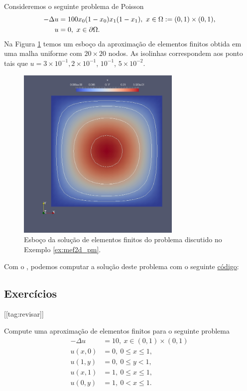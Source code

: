 \begin{ex}\label{ex:mef2d_pm}
  Consideremos o seguinte problema de Poisson
  \begin{align}
    -\Delta u &= 100x_0(1-x_0)x_1(1-x_1),~x\in\Omega:=(0, 1)\times (0, 1),\\
    u &= 0,~x\in\partial\Omega.
  \end{align}
  Na Figura \ref{fig:mef2d_pm} temos um esboço da aproximação de elementos finitos obtida em uma malha uniforme com $20\times 20$ nodos. As isolinhas correspondem aos ponto tais que $u=3\times 10^{-1}, 2\times 10^{-1}$, $10^{-1}$, $5\times 10^{-2}$.

  \begin{figure}[h!]
    \centering
    \includegraphics[width=0.7\textwidth]{./cap_mef2d/dados/ex_mef2d_pm/fig_mef2d_pm}
    \caption{Esboço da solução de elementos finitos do problema discutido no Exemplo \ref{ex:mef2d_pm}.}
    \label{fig:mef2d_pm}
  \end{figure}

\ifispython
Com o \fenics, podemos computar a solução deste problema com o seguinte \href{https://github.com/phkonzen/notas/blob/master/src/MetodoElementosFinitos/cap_mef2d/dados/ex_mef2d_pm/ex_mef2d_pm.py}{código}:

\fi
\end{ex}

\subsection{Exercícios}
[[tag:revisar]]


\begin{exer}
  Compute uma aproximação de elementos finitos para o seguinte problema
\begin{align}
  -\Delta u &= 10,~x\in (0, 1)\times (0, 1)\\
  u(x,0) &= 0,~0\leq x \leq 1,\\
  u(1,y) &= 0,~0\leq y < 1,\\
  u(x,1) &= 1,~0\leq x \leq 1,\\
  u(0,y) &= 1,~0<x\leq 1.
\end{align}
\end{exer}

